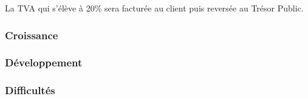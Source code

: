 \documentclass[10pt]{article}
\begin{document}
La TVA qui s'élève à 20\% sera facturée au client puis reversée au Trésor Public.

\subsubsection{Croissance}
\label{ssub:croissance}

\subsubsection{Développement}
\label{ssub:developpement}

\subsubsection{Difficultés}
\label{ssub:difficultés}






\end{document}

